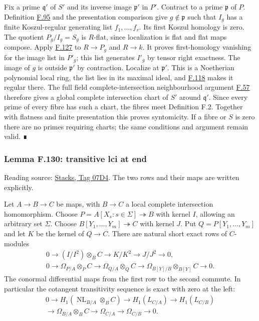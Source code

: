 \documentclass[11pt,a4paper,openany]{report}
\providecommand{\NL}{\operatorname{NL}}
\begin{document}
Fix a prime \(\mathfrak q'\) of \(S'\) and its inverse image \(\mathfrak p'\) in \(P'\). Contract to a prime \(\mathfrak p\) of \(P\). Definition \hyperref[AG-RG-S05-more-algebra-definition-regular-ideal]{F.95} and the presentation comparison give \(g\notin\mathfrak p\) such that \(I_g\) has a finite Koszul-regular generating list \(f_1,\ldots,f_r\). Its first Koszul homology is zero. The quotient \(P_g/I_g=S_g\) is \(R\)-flat, since localization is flat and flat maps compose. Apply \hyperref[AG-RG-S05-more-algebra-lemma-relative-regular-immersion-algebra]{F.127} to \(R\to P_g\) and \(R\to k\). It proves first-homology vanishing for the image list in \(P'_g\); this list generates \(I'_g\) by tensor right exactness. The image of \(g\) is outside \(\mathfrak p'\) by contraction. Localize at \(\mathfrak p'\). This is a Noetherian polynomial local ring, the list lies in its maximal ideal, and \hyperref[AG-RG-S05-more-algebra-lemma-noetherian-finite-all-equivalent]{F.118} makes it regular there. The full field complete-intersection neighbourhood argument \hyperref[AG-RG-S05-algebra-lemma-lci]{F.57} therefore gives a global complete intersection chart of \(S'\) around \(\mathfrak q'\). Since every prime of every fibre has such a chart, the fibres meet Definition F.2. Together with flatness and finite presentation this proves syntomicity. If a fibre or \(S\) is zero there are no primes requiring charts; the same conditions and argument remain valid. ∎

\label{AG-RG-S05-more-algebra-lemma-transitive-lci-at-end}

\subsubsection{Lemma F.130: transitive lci at end}\label{AG-RG-S05-lemma-f.130-transitive-lci-at-end}

Reading source: \href{https://stacks.math.columbia.edu/tag/07D4}{Stacks, Tag 07D4}. The two rows and their maps are written explicitly.

Let \(A\to B\to C\) be maps, with \(B\to C\) a local complete intersection homomorphism. Choose \(P=A[X_s:s\in\Sigma]\twoheadrightarrow B\) with kernel \(I\), allowing an arbitrary set \(\Sigma\). Choose \(B[Y_1,\ldots,Y_m]\twoheadrightarrow C\) with kernel \(J\). Put \(Q=P[Y_1,\ldots,Y_m]\) and let \(K\) be the kernel of \(Q\to C\). There are natural short exact rows of \(C\)-modules \[\begin{gathered}
0\to(I/I^2)\otimes_B C\to K/K^2\to J/J^2\to0,\\
0\to\Omega_{P/A}\otimes_P C\to\Omega_{Q/A}\otimes_Q C
\to\Omega_{B[Y]/B}\otimes_{B[Y]} C\to0.
\end{gathered}\] The conormal differential maps from the first row to the second commute. In particular the cotangent transitivity sequence is exact with zero at the left: \[\begin{gathered}
0\to H_1(\NL_{B/A}\otimes_B C)\to H_1(L_{C/A})\to H_1(L_{C/B})\\
\to\Omega_{B/A}\otimes_B C\to\Omega_{C/A}\to\Omega_{C/B}\to0.
\end{gathered}\]
\end{document}
